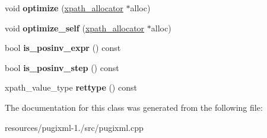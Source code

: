 \begin{DoxyCompactItemize}
\item 
\hypertarget{classxpath__ast__node_a950534fc7de08fe40d897ebea84c1d6d}{void {\bfseries optimize} (\hyperlink{classxpath__allocator}{xpath\+\_\+allocator} $\ast$alloc)}\label{classxpath__ast__node_a950534fc7de08fe40d897ebea84c1d6d}

\item 
\hypertarget{classxpath__ast__node_a3eb089927cabd867a3a9d1b723aece0d}{void {\bfseries optimize\+\_\+self} (\hyperlink{classxpath__allocator}{xpath\+\_\+allocator} $\ast$alloc)}\label{classxpath__ast__node_a3eb089927cabd867a3a9d1b723aece0d}

\item 
\hypertarget{classxpath__ast__node_aa683d40f3ad22dfe89889bf6ca888082}{bool {\bfseries is\+\_\+posinv\+\_\+expr} () const }\label{classxpath__ast__node_aa683d40f3ad22dfe89889bf6ca888082}

\item 
\hypertarget{classxpath__ast__node_a2af0b84caf47031c30c80f5c2206392e}{bool {\bfseries is\+\_\+posinv\+\_\+step} () const }\label{classxpath__ast__node_a2af0b84caf47031c30c80f5c2206392e}

\item 
\hypertarget{classxpath__ast__node_a2c3598521141ed4b763fe6c4f852234f}{xpath\+\_\+value\+\_\+type {\bfseries rettype} () const }\label{classxpath__ast__node_a2c3598521141ed4b763fe6c4f852234f}

\end{DoxyCompactItemize}


The documentation for this class was generated from the following file\+:\begin{DoxyCompactItemize}
\item 
resources/pugixml-\/1./src/pugixml.\+cpp\end{DoxyCompactItemize}
